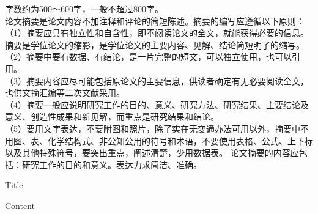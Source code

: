 ﻿
\begin{cn_abstract}
  字数约为500～600字，一般不超过800字。\\
论文摘要是论文内容不加注释和评论的简短陈述。摘要的编写应遵循以下原则：\\
（1）摘要应具有独立性和自含性，即不阅读论文的全文，就能获得必要的信息。摘要是学位论文的缩影，是学位论文的主要内容、见解、结论简短明了的缩写。\\
（2）摘要中要有数据、有结论，是一片完整的短文，可以独立使用，也可以引用。\\
（3）摘要内容应尽可能包括原论文的主要信息，供读者确定有无必要阅读全文，也供文摘汇编等二次文献采用。\\
（4）摘要一般应说明研究工作的目的、意义、研究方法、研究结果、主要结论及意义、创造性成果和新见解，而重点是研究结果和结论。\\
（5）要用文字表达，不要附图和照片，除了实在无变通办法可用以外，摘要中不用图、表、化学结构式、非公知公用的符号和术语，不要使用表格、公式、上下标以及其他特殊符号，要突出重点，阐述清楚，少用数据表。
论文摘要的内容应包括：研究工作的目的和意义。表达力求简洁、准确。\\
\end{cn_abstract}


\begin{en_abstract}
  \begin{center}
    {\songti{}Title}
  \end{center}

  \begin{center}

  \end{center}
  Content\\

\end{en_abstract}

